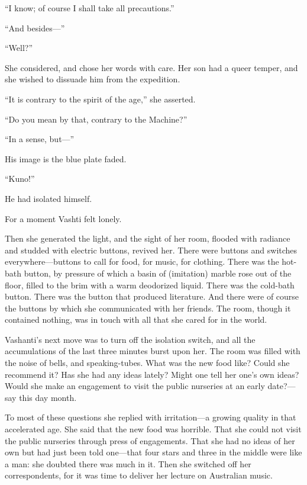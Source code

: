 ``I know; of course I shall take all precautions.''

``And besides---''

``Well?''

She considered, and chose her words with care. Her son had a queer temper, and she wished to dissuade him from the expedition.

``It is contrary to the spirit of the age,'' she asserted.

``Do you mean by that, contrary to the Machine?''

``In a sense, but---''

His image is the blue plate faded.

``Kuno!''

He had isolated himself.

For a moment Vashti felt lonely.

Then she generated the light, and the sight of her room, flooded with radiance and studded with electric buttons, revived her. There were buttons and switches everywhere---buttons to call for food, for music, for clothing. There was the hot-bath button, by pressure of which a basin of (imitation) marble rose out of the floor, filled to the brim with a warm deodorized liquid. There was the cold-bath button. There was the button that produced literature. And there were of course the buttons by which she communicated with her friends. The room, though it contained nothing, was in touch with all that she cared for in the world.

Vashanti's next move was to turn off the isolation switch, and all the accumulations of the last three minutes burst upon her. The room was filled with the noise of bells, and speaking-tubes. What was the new food like? Could she recommend it? Has she had any ideas lately? Might one tell her one's own ideas? Would she make an engagement to visit the public nurseries at an early date?---say this day month.

To most of these questions she replied with irritation---a growing quality in that accelerated age. She said that the new food was horrible. That she could not visit the public nurseries through press of engagements. That she had no ideas of her own but had just been told one---that four stars and three in the middle were like a man: she doubted there was much in it. Then she switched off her correspondents, for it was time to deliver her lecture on Australian music.

